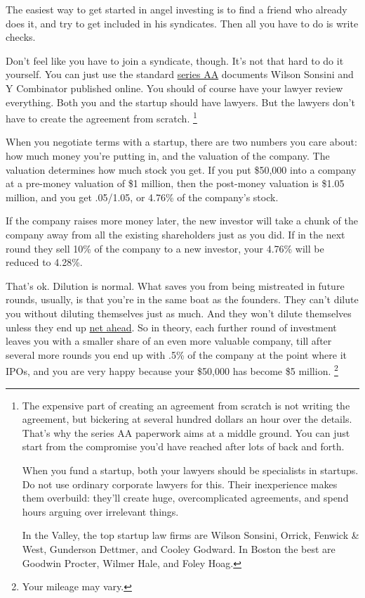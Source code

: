 The easiest way to get started in angel investing is to find a friend
who already does it, and try to get included in his syndicates. Then all
you have to do is write checks.

Don't feel like you have to join a syndicate, though. It's not that hard
to do it yourself. You can just use the standard
\href{http://ycombinator.com/seriesaa.html}{series AA} documents Wilson
Sonsini and Y Combinator published online. You should of course have
your lawyer review everything. Both you and the startup should have
lawyers. But the lawyers don't have to create the agreement from
scratch. \footnote{The expensive part of creating an agreement from scratch is not
writing the agreement, but bickering at several hundred dollars an hour
over the details. That's why the series AA paperwork aims at a middle
ground. You can just start from the compromise you'd have reached after
lots of back and forth.

When you fund a startup, both your lawyers should be specialists in
startups. Do not use ordinary corporate lawyers for this. Their
inexperience makes them overbuild: they'll create huge, overcomplicated
agreements, and spend hours arguing over irrelevant things.

In the Valley, the top startup law firms are Wilson Sonsini, Orrick,
Fenwick \& West, Gunderson Dettmer, and Cooley Godward. In Boston the
best are Goodwin Procter, Wilmer Hale, and Foley Hoag.}

When you negotiate terms with a startup, there are two numbers you care
about: how much money you're putting in, and the valuation of the
company. The valuation determines how much stock you get. If you put
\$50,000 into a company at a pre-money valuation of \$1 million, then
the post-money valuation is \$1.05 million, and you get .05/1.05, or
4.76\% of the company's stock.

If the company raises more money later, the new investor will take a
chunk of the company away from all the existing shareholders just as you
did. If in the next round they sell 10\% of the company to a new
investor, your 4.76\% will be reduced to 4.28\%.

That's ok. Dilution is normal. What saves you from being mistreated in
future rounds, usually, is that you're in the same boat as the founders.
They can't dilute you without diluting themselves just as much. And they
won't dilute themselves unless they end up \href{equity.html}{net
ahead}. So in theory, each further round of investment leaves you with a
smaller share of an even more valuable company, till after several more
rounds you end up with .5\% of the company at the point where it IPOs,
and you are very happy because your \$50,000 has become \$5 million.
\footnote{Your mileage may vary.}

